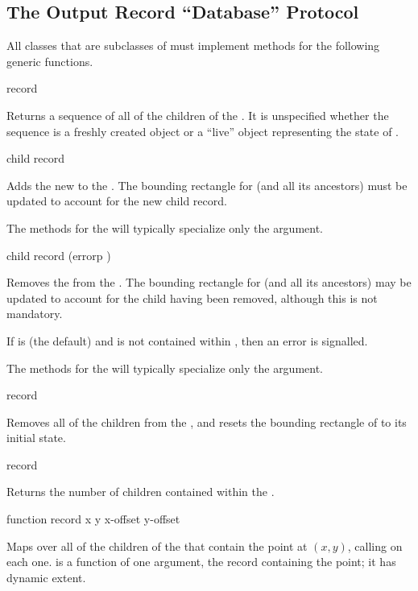 \subsection {The Output Record ``Database'' Protocol}

All classes that are subclasses of  must implement methods for
the following generic functions.

 {record}

Returns a sequence of all of the children of the 
.  It is unspecified whether the sequence is a freshly created
object or a ``live'' object representing the state of .

 {child record}

Adds the new   to the 
.  The bounding rectangle for  (and all its ancestors)
must be updated to account for the new child record.

The methods for the  will typically specialize only the
 argument.

 {child record \optional (errorp )}

Removes the   from the 
.  The bounding rectangle for  (and all its ancestors)
may be updated to account for the child having been removed, although this is
not mandatory.

If  is  (the default) and  is not contained
within , then an error is signalled.

The methods for the  will typically specialize only the
 argument.

 {record}

Removes all of the children from the  , and
resets the bounding rectangle of  to its initial state.

 {record}

Returns the number of children contained within the 
.


            {function record x y \optional x-offset y-offset}

Maps over all of the children of the   that
contain the point at $(x,y)$, calling  on each one.
 is a function of one argument, the record containing the point;
it has dynamic extent.


